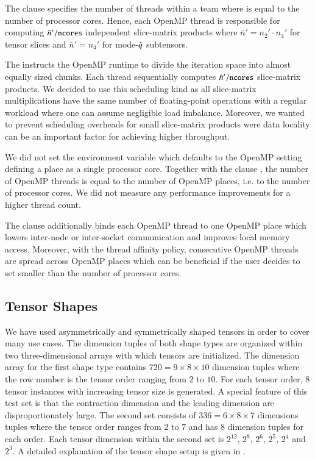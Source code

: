 The  clause specifies the number of threads within a team where  is equal to the number of processor cores. 
Hence, each OpenMP thread is responsible for computing $\bar{n}' / \text{\texttt{\small ncores}}$ independent slice-matrix products where $\bar{n}' = n_2' \cdot n_4'$ for tensor slices and $\bar{n}' = n_4'$ for mode-$\hat{q}$ subtensors.

The  instructs the OpenMP runtime to divide the iteration space into almost equally sized chunks.
Each thread sequentially computes $ \bar{n}' / \text{\texttt{\small ncores}}$ slice-matrix products.
We decided to use this scheduling kind as all slice-matrix multiplications have the same number of floating-point operations with a regular workload where one can assume negligible load imbalance.
Moreover, we wanted to prevent scheduling overheads for small slice-matrix products were data locality can be an important factor for achieving higher throughput.

We did not set the  environment variable which defaults to the OpenMP  setting defining a place as a single processor core. %
Together with the clause , the number of OpenMP threads is equal to the number of OpenMP places, i.e. to the number of processor cores.
We did not measure any performance improvements for a higher thread count.

The  clause additionally binds each OpenMP thread to one OpenMP place which lowers inter-node or inter-socket communication and improves local memory access.
Moreover, with the  thread affinity policy, consecutive OpenMP threads are spread across OpenMP places which can be beneficial if the user decides to set  smaller than the number of processor cores.

 

\subsection{Tensor Shapes} 
We have used asymmetrically and symmetrically shaped tensors in order to cover many use cases. 
The dimension tuples of both shape types are organized within two three-dimensional arrays with which tensors are initialized.
The dimension array for the first shape type contains $720 = 9\times 8 \times 10$ dimension tuples where the row number is the tensor order ranging from $2$ to $10$. 
For each tensor order, $8$ tensor instances with increasing tensor size is generated.
A special feature of this test set is that the contraction dimension and the leading dimension are disproportionately large.
The second set consists of $336 = 6\times8\times 7$ dimensions tuples where the tensor order ranges from $2$ to $7$ and has $8$ dimension tuples for each order.
Each tensor dimension within the second set is $2^{12}$, $2^{8}$, $2^{6}$, $2^5$, $2^4$ and $2^3$.
A detailed explanation of the tensor shape setup is given in \cite{bassoy:2019:ttv, bassoy:2018:fast}.

